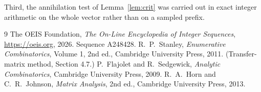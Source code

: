 \documentclass[11pt,a4paper]{article}
\theoremstyle{plain}
\theoremstyle{definition}
\begin{document}
Third, the annihilation test of Lemma~\ref{lem:crit} was carried out in exact integer
arithmetic on the whole vector rather than on a sampled prefix.

\begin{thebibliography}{9}
 The OEIS Foundation, \emph{The On-Line Encyclopedia of Integer
Sequences}, \url{https://oeis.org}, 2026. Sequence A248428.
 R.~P.~Stanley, \emph{Enumerative Combinatorics}, Volume 1, 2nd ed.,
Cambridge University Press, 2011. (Transfer-matrix method, Section 4.7.)
 P.~Flajolet and R.~Sedgewick, \emph{Analytic Combinatorics}, Cambridge
University Press, 2009.
 R.~A.~Horn and C.~R.~Johnson, \emph{Matrix Analysis}, 2nd ed., Cambridge
University Press, 2013.
\end{thebibliography}
\end{document}
